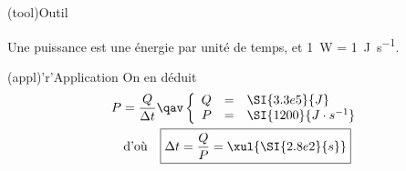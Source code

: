 \documentclass[../main/main.tex]{subfiles}
\begin{document}
{\begin{enumerate}
\begin{tcbraster}[raster columns=2, raster equal height=rows]
\begin{tcb}
			      \end{tcb}
		      \end{tcbraster}
		      \begin{tcbraster}[raster columns=2, raster equal height=rows]
			      \begin{tcb}(tool){Outil}

				      Une puissance est une énergie par unité de temps, et
				      \SI{1}{W} = \SI{1}{J.s^{-1}}.

			      \end{tcb}
			      \begin{tcb}(appl)'r'{Application}
				      On en déduit
				      \begin{gather*}
					      P = \frac{Q}{\Delta t}
					      \qav
					      \left\{
					      \begin{array}{rcl}
						      Q & = & \SI{3.3e5}{J}            \\
						      P & = & \SI{1200}{J\cdot s^{-1}}
					      \end{array}
					      \right.
					      \\
					      \text{d'où}\quad
					      \boxed{\Delta t = \frac{Q}{P} = \xul{\SI{2.8e2}{s}}}
				      \end{gather*}
			      \end{tcb}
		      \end{tcbraster}
	\end{enumerate}
}
\end{document}
